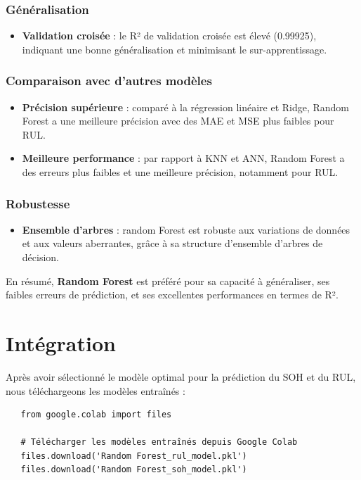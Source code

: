 \subsubsection*{Généralisation}
\begin{itemize}
	\item \textbf{Validation croisée} : le R² de validation croisée est élevé (0.99925), indiquant une bonne généralisation et minimisant le sur-apprentissage.
\end{itemize}

\subsubsection*{Comparaison avec d'autres modèles}
\begin{itemize}
	\item \textbf{Précision supérieure} : comparé à la régression linéaire et Ridge, Random Forest a une meilleure précision avec des MAE et MSE plus faibles pour RUL.
	\item \textbf{Meilleure performance} : par rapport à KNN et ANN, Random Forest a des erreurs plus faibles et une meilleure précision, notamment pour RUL.
\end{itemize}

\subsubsection*{Robustesse}
\begin{itemize}
	\item \textbf{Ensemble d'arbres} : random Forest est robuste aux variations de données et aux valeurs aberrantes, grâce à sa structure d'ensemble d'arbres de décision.
\end{itemize}
En résumé, \textbf{Random Forest} est préféré pour sa capacité à généraliser, ses faibles erreurs de prédiction, et ses excellentes performances en termes de R².
\section{Intégration}

Après avoir sélectionné le modèle optimal pour la prédiction du SOH et du RUL, nous téléchargeons les modèles entraînés :  

\begin{verbatim}
   from google.colab import files
   
   # Télécharger les modèles entraînés depuis Google Colab
   files.download('Random Forest_rul_model.pkl')
   files.download('Random Forest_soh_model.pkl')
\end{verbatim}


